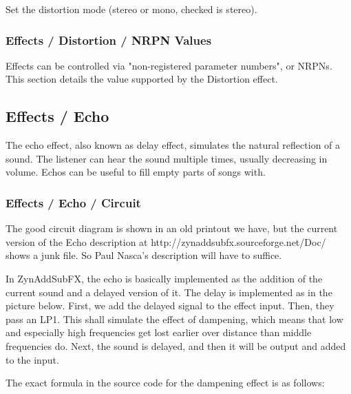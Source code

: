    Set the distortion mode (stereo or mono, checked is stereo).

\subsubsection{Effects / Distortion / NRPN Values}
\label{subsubsec:effects_edit_distortion_nrpn}

   Effects can be controlled via "non-registered parameter numbers", or NRPNs.
   This section details the value supported by the Distortion effect.

\subsection{Effects / Echo}
\label{subsec:effects_edit_echo}

   The echo effect, also known as delay effect, simulates the natural
   reflection of a sound. The listener can hear the sound multiple times,
   usually decreasing in volume. Echos can be useful to fill empty parts of
   songs with.

\subsubsection{Effects / Echo / Circuit}
\label{subsubsec:effects_edit_echo_circuit}

   The good circuit diagram is shown in an old printout we have, but the
   current version of the Echo description at
   http://zynaddsubfx.sourceforge.net/Doc/ shows a
   junk file.  So Paul Nasca's description will have to suffice.


   In ZynAddSubFX, the echo is basically implemented as the addition of the
   current sound and a delayed version of it. The delay is implemented as in
   the picture below. First, we add the delayed signal to the effect input.
   Then, they pass an LP1. This shall simulate the effect of dampening, which
   means that low and especially high frequencies get lost earlier over
   distance than middle frequencies do. Next, the sound is delayed, and then
   it will be output and added to the input.

   The exact formula in the source code for the dampening effect is as
   follows:

